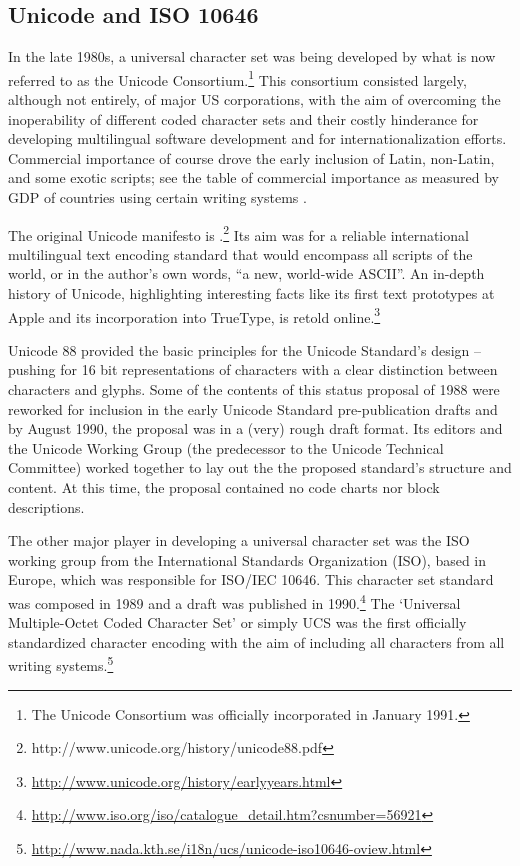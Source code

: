 	
\subsection{Unicode and ISO 10646}

In the late 1980s, a universal character set was being developed by what 
is now referred to as the Unicode Consortium.\footnote{The Unicode 
Consortium was officially incorporated in January 1991.} This consortium 
consisted largely, although not entirely, of major US corporations, with 
the aim of overcoming the inoperability of different coded character sets 
and their costly hinderance for developing multilingual software development 
and for internationalization efforts. Commercial importance of course drove 
the early inclusion of Latin, non-Latin, and some exotic scripts; see the 
table of commercial importance as measured by GDP of countries using certain 
writing systems \citep[2]{unicode88}.

The original Unicode manifesto is \cite{unicode88.pdf}.\footnote{http://www.unicode.org/history/unicode88.pdf} 
Its aim was for a reliable international multilingual text encoding standard 
that would encompass all scripts of the world, or in the author's own words, 
``a new, world-wide ASCII''. An in-depth history of Unicode, highlighting 
interesting facts like its first text prototypes at Apple and its incorporation 
into TrueType, is retold online.\footnote{\url{http://www.unicode.org/history/earlyyears.html}}

Unicode 88 provided the basic principles for the Unicode Standard's design -- 
pushing for 16 bit representations of characters with a clear distinction 
between characters and glyphs. Some of the contents of this status proposal 
of 1988 were reworked for inclusion in the early Unicode Standard pre-publication 
drafts and by August 1990, the proposal was in a (very) rough draft format. Its 
editors and the Unicode Working Group (the predecessor to the Unicode Technical 
Committee) worked together to lay out the the proposed standard's structure and 
content. At this time, the proposal contained no code charts nor block descriptions. 


The other major player in developing a universal character set was the ISO 
working group from the International Standards Organization (ISO), based 
in Europe, which was responsible for ISO/IEC 10646. This character set 
standard was composed in 1989 and a draft was published in 1990.\footnote{\url{http://www.iso.org/iso/catalogue_detail.htm?csnumber=56921}} 
The `Universal Multiple-Octet Coded Character Set' or simply UCS was the first 
officially standardized character encoding with the aim of including all characters from all writing systems.\footnote{\url{http://www.nada.kth.se/i18n/ucs/unicode-iso10646-oview.html}}


